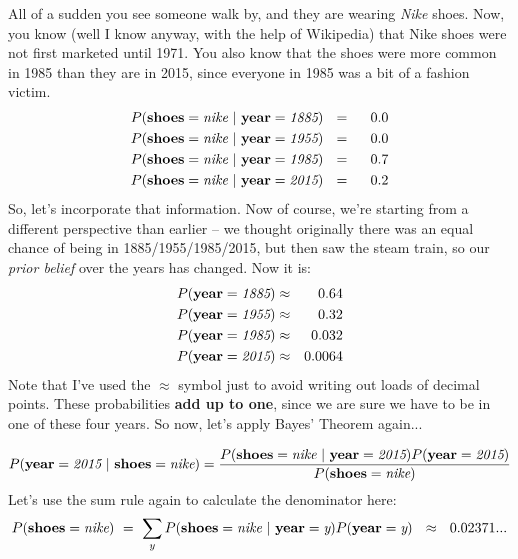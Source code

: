 \documentclass[a4paper,10pt]{article}
\begin{document}
\noindent All of a sudden you see someone walk by, and they are wearing {\em Nike} shoes.  Now, you know (well I know anyway, with the help of Wikipedia)
that Nike shoes were not first marketed until 1971.  You also know that the shoes were  more common in 1985 than they are in 2015, since everyone in 1985 was a bit of a fashion victim.
\begin{eqnarray*}
P({\bf shoes}=\textit{nike}~|~{\bf year}=\textit{1885})~~&=&~~ 0.0\\
P({\bf shoes}=\textit{nike}~|~{\bf year}=\textit{1955} )~~&=&~~ 0.0\\
P({\bf shoes}=\textit{nike}~|~{\bf year}=\textit{1985})~~&=&~~ 0.7\\
P({\bf shoes}=\textit{nike}~|~{\bf year}=\textit{2015})~~&=&~~ 0.2\\
\end{eqnarray*}
%
So, let's incorporate that information. Now of course, we're starting from a different perspective than earlier -- we thought originally there was an equal chance of being in 1885/1955/1985/2015, but then saw the steam train, so our {\em prior belief} over the years has changed. Now it is:
\begin{eqnarray*}
P({\bf year}=\textit{1885}) &\approx& 0.64\\
P({\bf year}=\textit{1955}) &\approx& 0.32 \\
P({\bf year}=\textit{1985}) &\approx& 0.032 \\
P({\bf year}=\textit{2015}) &\approx& 0.0064 
\end{eqnarray*}
Note that I've used the $\approx$ symbol just to avoid writing out loads of decimal points. These probabilities {\bf add up to one},
since we are sure we have to be in one of these four years. So now, let's apply Bayes' Theorem again...

\begin{eqnarray*}
P({\bf year}=\textit{2015}~|~{\bf shoes}=\textit{nike})= \frac{P({\bf shoes}=\textit{nike}~|~{\bf year}=\textit{2015})  P({\bf year}=\textit{2015})}
{P({\bf shoes}=\textit{nike})}
\end{eqnarray*}
Let's use the sum rule again to calculate the denominator here:
\begin{eqnarray*}
P({\bf shoes}=\textit{nike})~=~\sum_{y} P({\bf shoes}=\textit{nike}~|~{\bf year}=\textit{y}) P({\bf year}=\textit{y})~~\approx~~0.02371...
\end{eqnarray*}
\end{document}
